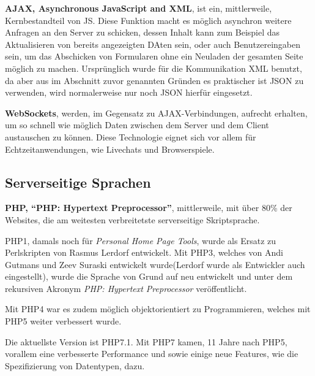 \documentclass[a4paper,12pt,ngerman,listof=numbered]{scrartcl}      %
\let\oldcite\cite
\renewcommand{\cite}[1]{\textsuperscript{\oldcite{#1}}}
\newcommand{\spacer}{\par\bigskip\noindent}
\begin{document}
	\spacer\textbf{AJAX, Asynchronous JavaScript and XML}, ist ein, mittlerweile, Kernbestandteil von JS. Diese Funktion macht es möglich asynchron weitere Anfragen an den Server zu schicken, dessen Inhalt kann zum Beispiel das Aktualisieren von bereits angezeigten DAten sein, oder auch Benutzereingaben sein, um das Abschicken von Formularen ohne ein Neuladen der gesamten Seite möglich zu machen. Ursprünglich wurde für die Kommunikation XML benutzt, da aber aus im Abschnitt zuvor genannten Gründen es praktischer ist JSON zu verwenden, wird normalerweise nur noch JSON hierfür eingesetzt.\cite{ajaxWiki}\par
	
	\spacer\textbf{WebSockets}, werden, im Gegensatz zu AJAX-Verbindungen, aufrecht erhalten, um so schnell wie möglich Daten zwischen dem Server und dem Client austauschen zu können. Diese Technologie eignet sich vor allem für Echtzeitanwendungen, wie Livechats und Browserspiele.\cite{websocketWiki}\par
	
	\subsection{Serverseitige Sprachen}
	
	\spacer\textbf{PHP, ``PHP: Hypertext Preprocessor''}, mittlerweile, mit über 80\% der Websites, die am weitesten verbreitetste serverseitige Skriptsprache.\cite{phpCoverage}\par
	PHP1, damals noch für \emph{Personal Home Page Tools}, wurde als Ersatz zu Perlskripten von Rasmus Lerdorf entwickelt. Mit PHP3, welches von Andi Gutmans und Zeev Suraski entwickelt wurde(Lerdorf wurde als Entwickler auch eingestellt), wurde die Sprache von Grund auf neu entwickelt und unter dem rekursiven Akronym \emph{PHP: Hypertext Preprocessor} veröffentlicht.\par
	Mit PHP4 war es zudem möglich objektorientiert zu Programmieren, welches mit PHP5 weiter verbessert wurde.\par
	Die aktuellste Version ist PHP7.1. Mit PHP7 kamen, 11 Jahre nach PHP5, vorallem eine verbesserte Performance und sowie einige neue Features, wie die Spezifizierung von Datentypen, dazu.\cite{phpWiki}\par
	
\end{document}
